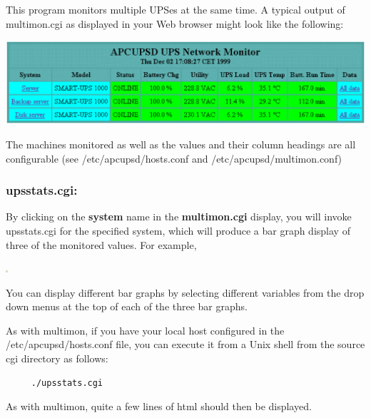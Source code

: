 {{{{{\label{index-multimon-126}
\label{index-CGI_002c-multimon-127}
This program monitors multiple UPSes at the same time. A typical output of
multimon.cgi as displayed in your Web browser might look like the following:  

\includegraphics{./multimon.eps}  

The machines monitored as well as the values and their column headings are all
configurable (see /etc/apcupsd/hosts.conf and /etc/apcupsd/multimon.conf) 

\label{upsstats_005fcgi}

\subsubsection*{upsstats.cgi:}

\label{index-upsstats-128}
\label{index-CGI_002c-upsstats-129}
By clicking on the {\bf system} name in the {\bf multimon.cgi} display, you
will invoke upsstats.cgi for the specified system, which will produce a bar
graph display of three of the monitored values. For example,  

\includegraphics{./status.eps}  

You can display different bar graphs by selecting different variables from the
drop down menus at the top of each of the three bar graphs.  

As with multimon, if you have your local host configured in the
/etc/apcupsd/hosts.conf file, you can execute it from a Unix shell from the
source cgi directory as follows: 

\label{_005f_002fupsstats_005fcgi}

\begin{verbatim}
     ./upsstats.cgi
\end{verbatim}

\label{index-upssstats-130}
\label{index-CGI_002c-upssstats-131}
As with multimon, quite a few lines of html should then be displayed. 

}}}}}
